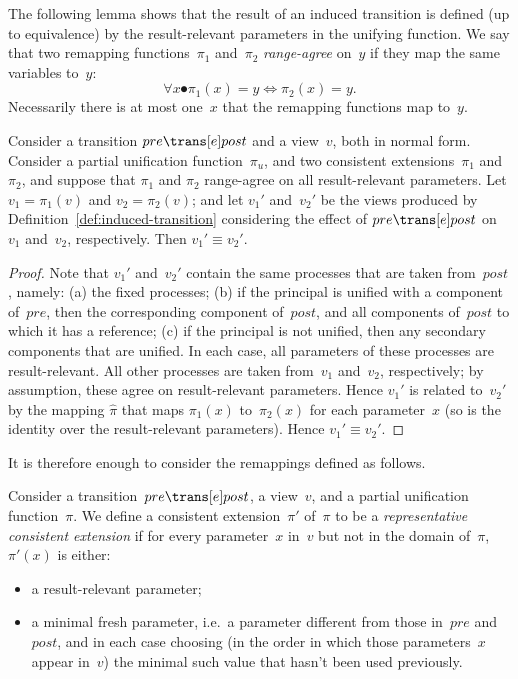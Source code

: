 The following lemma shows that the result of an induced transition is defined
(up to equivalence) by the result-relevant parameters in the unifying
function.
We say that two remapping functions~$\pi_1$ and~$\pi_2$ \emph{range-agree}
on~$y$ if they map the same variables to~$y$:
\[
\forall x \spot \pi_1(x) = y \iff \pi_2(x) = y.
\]
Necessarily there is at most one~$x$ that the remapping functions map to~$y$.
%
\begin{lemma}
\label{lem:remappings-equivalent}
Consider a transition $pre \trans[e] post$ and a view~$v$, both in normal form.
Consider a partial unification function~$\pi_u$, and two consistent
extensions~$\pi_1$ and~$\pi_2$, and suppose that $\pi_1$ and $\pi_2$
range-agree on all result-relevant parameters.  Let $v_1 = \pi_1(v)$ and $v_2
= \pi_2(v)$; and let $v_1'$ and~$v_2'$ be the views produced by
Definition~\ref{def:induced-transition} considering the effect of $pre
\trans[e] post$ on~$v_1$ and~$v_2$, respectively.  Then $v_1' \equiv v_2'$. 
\end{lemma}


\begin{proof}
Note that $v_1'$ and~$v_2'$ contain the same processes that are taken
from~$post$, namely: (a) the fixed processes; (b) if the principal is unified
with a component of~$pre$, then the corresponding component of~$post$, and all
components of~$post$ to which it has a reference; (c) if the principal is not
unified, then any secondary components that are unified.  In each case, all
parameters of these processes are result-relevant.  All other processes are
taken from~$v_1$ and~$v_2$, respectively; by assumption, these agree on
result-relevant parameters.  Hence $v_1'$ is related to~$v_2'$ by the mapping
$\hat\pi$ that maps $\pi_1(x)$ to~$\pi_2(x)$ for each parameter~$x$ (so is the
identity over the result-relevant parameters).  Hence $v_1' \equiv v_2'$.
\end{proof}


It is therefore enough to consider the remappings defined as follows.
%
\begin{definition}
\label{def:representative-consistent-extension}
Consider a transition~$pre \trans[e] post$, a view~$v$, and a
partial unification function~$\pi$.  We define a consistent extension~$\pi'$
of~$\pi$ to be a \emph{representative consistent extension} if for every
parameter~$x$ in~$v$ but not in the domain of~$\pi$,\, $\pi'(x)$ is either:
\begin{itemize}
\item a result-relevant parameter;

\item a minimal fresh parameter, i.e.~a parameter different from those
  in~$pre$ and~$post$, and in each case choosing (in the order in which those
  parameters~$x$ appear in~$v$) the minimal such value that hasn't been used
  previously.
\end{itemize}
\end{definition}

